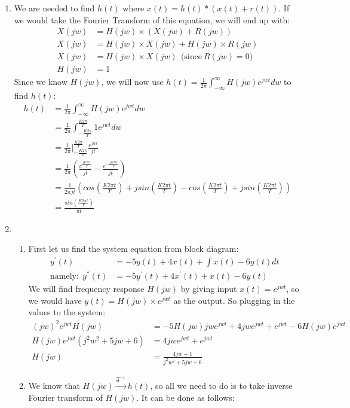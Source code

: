 \documentclass[10pt,a4paper, margin=1in]{article}
\begin{document}
\begin{enumerate}
\item 
	We are needed to find $h(t)$ where $x(t) = h(t)*(x(t)+r(t))$. If we would take the Fourier Transform of this equation, we will end up with:
	\begin{align*}
	X(jw) &= H(jw) \times (X(jw)+R(jw)) \\	
	X(jw) &= H(jw) \times X(jw) + H(jw) \times R(jw) \\
	X(jw) &= H(jw) \times X(jw) \ \ \text{(since} \ R(jw)=0\text{)}\\ 
	H(jw) &= 1
	\end{align*}
	Since we know $H(jw)$, we will now use $h(t) = \frac{1}{2\pi}\int_{-\infty}^{\infty} H(jw)e^{jwt}dw$ to find $h(t)$:
	\begin{align*}
	h(t) &= \frac{1}{2\pi}\int_{-\infty}^{\infty} H(jw)e^{jwt}dw \\
 		 &= \frac{1}{2\pi}\int_{-\frac{K2\pi}{T}}^{\frac{K2\pi}{T}} 1e^{jwt}dw \\
		 &= \frac{1}{2\pi}|^{\frac{K2\pi}{T}}_{-\frac{K2\pi}{T}}\frac{e^{jwt}}{jt} \\
		 &= \frac{1}{2\pi}(\frac{e^{\frac{jK2\pi t}{T}}}{jt} - \frac{e^{-\frac{jK2\pi t}{T}}}{jt}) \\
		 &= \frac{1}{2\pi jt}(cos(\frac{K2\pi t}{T})+jsin(\frac{K2\pi t}{T}) - cos(\frac{K2\pi t}{T})+jsin(\frac{K2\pi t}{T})) \\
		 &= \frac{sin(\frac{K2\pi t}{T})}{\pi t} 
	\end{align*}
\item 
	\begin{enumerate}
		\item
			First let us find the system equation from block diagram:
	\begin{align*}
		y^{'}(t)&=-5y(t)+4x(t) + \int x(t)-6y(t) dt\\
		\text{namely:} \ \ y^{''}(t)&=-5y^{'}(t)+4x^{'}(t) + x(t)-6y(t) 
	\end{align*}
	We will find frequency response $H(jw)$ by giving input $x(t) = e^{jwt}$, so we would have $y(t)=H(jw)\times e^{jwt}$ as the output. So plugging in the values to the system:
	\begin{align*}
	(jw)^2 e^{jwt} H(jw) &= -5H(jw)jw e^{jwt} + 4jw e^{jwt} + e^{jwt} - 6H(jw)e^{jwt} \\
	H(jw)e^{jwt}(j^2w^2 + 5jw + 6) &= 4jwe^{jwt} + e^{jwt} \\
	H(jw) &= \frac{4jw+1}{j^2w^2+5jw+6} 
	\end{align*}
	\item
		We know that $H(jw) \xrightarrow{\mathfrak{F}^{-1}} h(t)$, so all we need to do is to take inverse Fourier transform of $H(jw)$. It can be done as follows:

\end{enumerate}
\end{enumerate}
\end{document}

